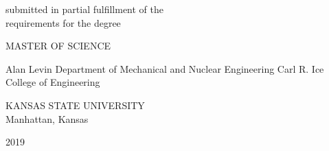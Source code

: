 \begin{center}
   \vspace{0.3cm}
   \begin{singlespace}
   submitted in partial fulfillment of the\\
   requirements for the degree\\
   \end{singlespace}

   \vspace{0.3cm}


   {\large MASTER OF SCIENCE}\\
   \vspace{0.3cm}


   \begin{singlespace}
   Alan Levin Department of Mechanical and Nuclear Engineering
   Carl R. Ice College of Engineering\\
   \end{singlespace}

   \vspace{0.3cm}

   \begin{singlespace}
   {\large KANSAS STATE UNIVERSITY}\\
   Manhattan, Kansas\\
   \end{singlespace}


   2019\\
   \vspace{0.3cm}

    \end{center}

